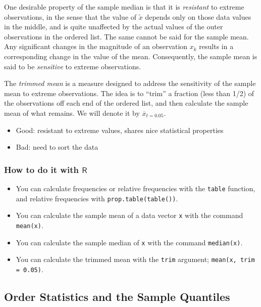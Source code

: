 \documentclass[captions=tableheading]{scrbook}
\begin{document}
One desirable property of the sample median is that it is \emph{resistant} to extreme observations, in the sense that the value of \(\tilde{x}\) depends only on those data values in the middle, and is quite unaffected by the actual values of the outer observations in the ordered list. The same cannot be said for the sample mean. Any significant changes in the magnitude of an observation \(x_{k}\) results in a corresponding change in the value of the mean. Consequently, the sample mean is said to be \emph{sensitive} to extreme observations.

The \emph{trimmed mean} is a measure designed to address the sensitivity of the sample mean to extreme observations. The idea is to ``trim'' a fraction (less than 1/2) of the observations off each end of the ordered list, and then calculate the sample mean of what remains. We will denote it by \(\overline{x}_{t=0.05}\).

\begin{itemize}
\item Good: resistant to extreme values, shares nice statistical properties
\item Bad: need to sort the data
\end{itemize}
\subsubsection{How to do it with \(\mathsf{R}\)}
\label{sec-3-3-2-1}


\begin{itemize}
\item You can calculate frequencies or relative frequencies with the \texttt{table} function, and relative frequencies with \texttt{prop.table(table())}.
\item You can calculate the sample mean of a data vector \texttt{x} with the command \texttt{mean(x)}.
\item You can calculate the sample median of \texttt{x} with the command \texttt{median(x)}.
\item You can calculate the trimmed mean with the \texttt{trim} argument; \texttt{mean(x, trim = 0.05)}.
\end{itemize}
\subsection{Order Statistics and the Sample Quantiles}
\label{sec-3-3-3}
\label{sub-Order-Statistics-and}
\end{document}

